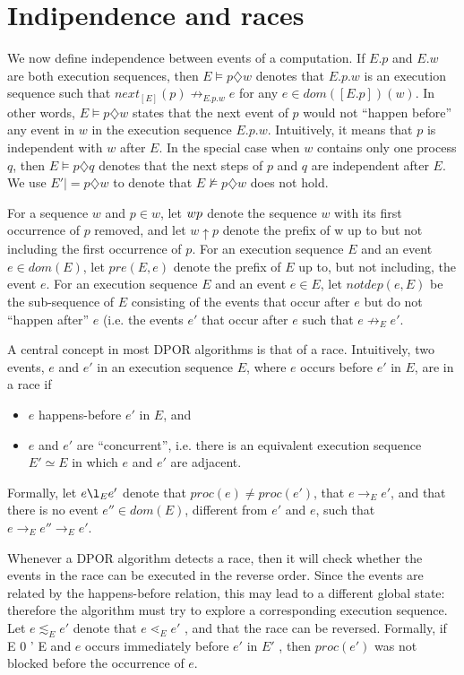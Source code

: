 \section{Indipendence and races}
We now define independence between events of a computation. If
$E.p$ and $E.w$ are both execution sequences, then $E \models p\diamondsuit w$ denotes
that $E.p.w$ is an execution sequence such that $next_{[E]}(p) \not \rightarrow_{E.p.w} e$
for any $e \in dom([E.p])(w)$. In other words, $E \models p \diamondsuit w$ states that
the next event of $p$ would not “happen before” any event in $w$
in the execution sequence $E.p.w$. Intuitively, it means that $p$ is
independent with $w$ after $E$. In the special case when $w$ contains
only one process $q$, then $E \models p \diamondsuit q$ denotes that the next steps of
$p$ and $q$ are independent after $E$. We use $E'| =p \diamondsuit w$ to denote that
$E \not \models p \diamondsuit w$ does not hold.

For a sequence $w$ and $p \in w$, let $w \\ p$ denote the sequence
$w$ with its first occurrence of $p$ removed, and let $w \uparrow p$ denote the
prefix of w up to but not including the first occurrence of $p$. For
an execution sequence $E$ and an event $e \in  dom(E)$, let $pre(E, e)$
denote the prefix of $E$ up to, but not including, the event $e$. For an
execution sequence $E$ and an event $e \in E$, let $notdep(e, E)$ be the
sub-sequence of $E$ consisting of the events that occur after $e$ but do
not “happen after” $e$ (i.e. the events $e'$ that occur after $e$ such that
$e \not \rightarrow_E e'$.


A central concept in most DPOR algorithms is that of a race.
Intuitively, two events, $e$ and $e'$ in an execution sequence $E$, where
$e$ occurs before $e'$ in $E$, are in a race if
\begin{itemize}
\item $e$ happens-before $e'$ in $E$, and
\item $e$ and $e'$ are “concurrent”, i.e. there is an equivalent execution
sequence $E' \simeq E$ in which $e$ and $e'$ are adjacent.
\end{itemize}
Formally, let $e \l_E e'$ denote that $proc(e) \not = proc(e')$, that $e \rightarrow_E e'$,
and that there is no event $e'' \in dom(E)$, different from $e'$ and $e$,
such that $e \rightarrow_E e'' \rightarrow_E e'$.

Whenever a DPOR algorithm detects a race, then it will check
whether the events in the race can be executed in the reverse order.
Since the events are related by the happens-before relation, this may
lead to a different global state: therefore the algorithm must try to
explore a corresponding execution sequence. Let $e \lesssim_E e'$ denote
that $e \lessdot_E e'$ , and that the race can be reversed. Formally, if E 0 ' E
and $e$ occurs immediately before $e'$ in $E'$ , then $proc(e')$ was not
blocked before the occurrence of $e$.


